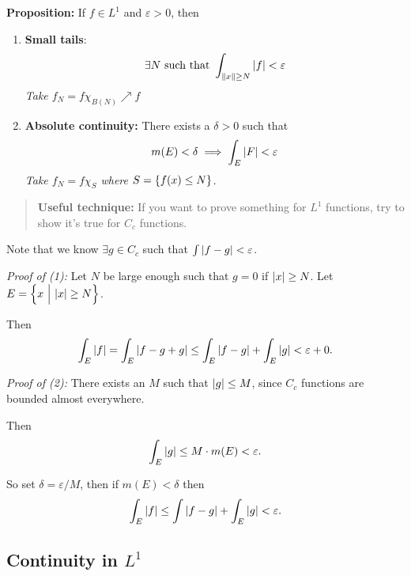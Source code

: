 \textbf{Proposition:} If \(f\in L^1\) and \(\varepsilon > 0\), then

\begin{enumerate}
\def\labelenumi{\arabic{enumi}.}
\item
  \textbf{Small tails}:
  \begin{align*}
  \exists N \text{ such that } \int_{{\left\lVert {x} \right\rVert} \geq N} {\left\lvert {f} \right\rvert} < \varepsilon
  \end{align*} \emph{Take \(f_N = f\chi_{B(N)} \nearrow f\)}
\item
  \textbf{Absolute continuity:} There exists a \(\delta > 0\) such that
  \begin{align*}
  m(E) < \delta \implies \int_E {\left\lvert {F} \right\rvert} < \varepsilon
  \end{align*} \emph{Take \(f_N = f\chi_S\) where
  \(S = \left\{{f(x) \leq N}\right\}\).}
\end{enumerate}

\begin{quote}
\textbf{Useful technique:} If you want to prove something for \(L^1\)
functions, try to show it's true for \(C_c\) functions.
\end{quote}

Note that we know \(\exists g\in C_c\) such that
\(\int {\left\lvert {f-g} \right\rvert} < \varepsilon\).

\emph{Proof of (1):} Let \(N\) be large enough such that \(g=0\) if
\({\left\lvert {x} \right\rvert} \geq N\). Let \(E = \left\{{x {~\mathrel{\Big|}~} {\left\lvert {x} \right\rvert} \geq N}\right\}\).

Then
\begin{align*}
\int_E {\left\lvert {f} \right\rvert} = \int_E {\left\lvert {f - g + g} \right\rvert} \leq \int_E{\left\lvert {f-g} \right\rvert} + \int_E{\left\lvert {g} \right\rvert} < \varepsilon  + 0.
\end{align*}

\emph{Proof of (2):} There exists an \(M\) such that \({\left\lvert {g} \right\rvert} \leq M\),
since \(C_c\) functions are bounded almost everywhere.

Then
\begin{align*}
\int_E {\left\lvert {g} \right\rvert} \leq M \cdot m(E) < \varepsilon.
\end{align*}

So set \(\delta = \varepsilon/M\), then if \(m(E) < \delta\) then
\begin{align*}
\int_E {\left\lvert {f} \right\rvert} \leq \int{\left\lvert {f-g} \right\rvert} + \int_E{\left\lvert {g} \right\rvert} < \varepsilon.
\end{align*}

\hypertarget{continuity-in-l1}{%
\subsection{\texorpdfstring{Continuity in
\(L^1\)}{Continuity in L\^{}1}}\label{continuity-in-l1}}

